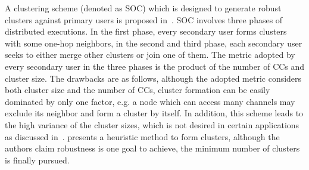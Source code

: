\documentclass[10pt,journal,compsoc]{IEEEtran}
\theoremstyle{mytheoremstyle}
\theoremstyle{mytheoremstyle}
\theoremstyle{mytheoremstyle}
\begin{document}
%
A clustering scheme (denoted as SOC) which is designed to generate robust clusters against primary users is proposed in~\cite{LIU_TMC11_2}.
SOC involves three phases of distributed executions.
In the first phase, every secondary user forms clusters with some one-hop neighbors, in the second and third phase, each secondary user seeks to either merge other clusters or join one of them.
The metric adopted by every secondary user in the three phases is the product of the number of CCs and cluster size.
The drawbacks are as follows, although the adopted metric considers both cluster size and the number of CCs, cluster formation can be easily dominated by only one factor, e.g. a node which can access many channels may exclude its neighbor and form a cluster by itself.
In addition, this scheme leads to the high variance of the cluster sizes, which is not desired in certain applications as discussed in~\cite{clustering_globecom11, cluster_EW10}.
\cite{mansoor_15_cluster_robust} presents a heuristic method to form clusters, although the authors claim robustness is one goal to achieve, the minimum number of clusters is finally pursued.
\end{document}

